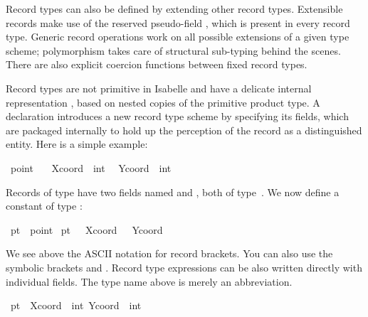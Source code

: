 \begin{isabellebody}
\begin{isamarkuptext}
  Record types can also be defined by extending other record types.
  Extensible records make use of the reserved pseudo-field ,
  which is present in every record type.  Generic record operations
  work on all possible extensions of a given type scheme; polymorphism
  takes care of structural sub-typing behind the scenes.  There are
  also explicit coercion functions between fixed record types.%
\end{isamarkuptext}%
\isamarkuptrue%
%
\isamarkuptrue%
%
\begin{isamarkuptext}%
Record types are not primitive in Isabelle and have a delicate
  internal representation \cite{NaraschewskiW-TPHOLs98}, based on
  nested copies of the primitive product type.  A 
  declaration introduces a new record type scheme by specifying its
  fields, which are packaged internally to hold up the perception of
  the record as a distinguished entity.  Here is a simple example:%
\end{isamarkuptext}%
\isamarkuptrue%
\isamarkupfalse%
\ point\ {\isacharequal}\isanewline
\ \ Xcoord\ {\isacharcolon}{\isacharcolon}\ int\isanewline
\ \ Ycoord\ {\isacharcolon}{\isacharcolon}\ int%
\begin{isamarkuptext}%
\noindent
  Records of type  have two fields named 
  and , both of type~.  We now define a
  constant of type :%
\end{isamarkuptext}%
\isamarkuptrue%
\isamarkupfalse%
\ pt{}\ {\isacharcolon}{\isacharcolon}\ point\ \isanewline
{\isachardoublequoteopen}pt{}\ {\isasymequiv}\ {\isacharparenleft}{\isacharbar}\ Xcoord\ {\isacharequal}\ {}{}{}{\isacharcomma}\ Ycoord\ {\isacharequal}\ {}{}\ {\isacharbar}{\isacharparenright}{\isachardoublequoteclose}%
\begin{isamarkuptext}%
\noindent
  We see above the ASCII notation for record brackets.  You can also
  use the symbolic brackets \isa{{\isasymlparr}} and \isa{{\isasymrparr}}.  Record type
  expressions can be also written directly with individual fields.
  The type name above is merely an abbreviation.%
\end{isamarkuptext}%
\isamarkuptrue%
\isamarkupfalse%
\ pt{}\ {\isacharcolon}{\isacharcolon}\ {\isachardoublequoteopen}{\isasymlparr}Xcoord\ {\isacharcolon}{\isacharcolon}\ int{\isacharcomma}\ Ycoord\ {\isacharcolon}{\isacharcolon}\ int{\isasymrparr}{\isachardoublequoteclose}\ \isanewline

\end{isabellebody}
